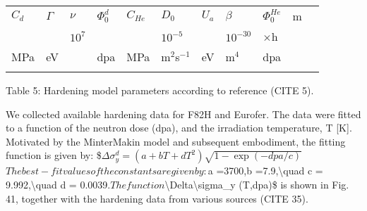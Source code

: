 \documentclass[letterpaper,10pt,english]{jupyterBook}
\begin{document}
	
	\begin{savenotes}\sphinxattablestart
		\sphinxthistablewithglobalstyle
		\centering
		\begin{tabulary}{\linewidth}[t]{TTTTTTTTTTT}
			\sphinxtoprule
			\sphinxstyletheadfamily 
			\sphinxAtStartPar
			\(C_d\)
			&\sphinxstyletheadfamily 
			\sphinxAtStartPar
			\(\Gamma\)
			&\sphinxstyletheadfamily 
			\sphinxAtStartPar
			\(\nu\)
			&\sphinxstyletheadfamily 
			\sphinxAtStartPar
			\(\Phi_0^d\)
			&\sphinxstyletheadfamily 
			\sphinxAtStartPar
			\(C_{He}\)
			&\sphinxstyletheadfamily 
			\sphinxAtStartPar
			\(D_0\)
			&\sphinxstyletheadfamily 
			\sphinxAtStartPar
			\(U_a\)
			&\sphinxstyletheadfamily 
			\sphinxAtStartPar
			\(\beta\)
			&\sphinxstyletheadfamily 
			\sphinxAtStartPar
			\(\Phi_0^{He}\)
			&\sphinxstyletheadfamily 
			\sphinxAtStartPar
			m
			&
			\sphinxAtStartPar
			
			\\
			\sphinxmidrule
			\sphinxtableatstartofbodyhook
			&
			&
			\sphinxAtStartPar
			\(10^7\)
			&
			&
			&
			\sphinxAtStartPar
			\(10^{-5}\)
			&
			&
			\sphinxAtStartPar
			\(10^{-30}\)
			&
			\(\times\)h
			&
			&
			\sphinxAtStartPar
			
			\\
			\sphinxhline
			\sphinxAtStartPar
			MPa
			&
			\sphinxAtStartPar
			eV
			&
			\sphinxAtStartPar
			\sphinxhyphen{}
			&
			\sphinxAtStartPar
			dpa
			&
			\sphinxAtStartPar
			MPa
			&
			\sphinxAtStartPar
			m\(^2\)s\(^{-1}\)
			&
			\sphinxAtStartPar
			eV
			&
			\sphinxAtStartPar
			m\(^4\)
			&
			\sphinxAtStartPar
			dpa
			&
			\sphinxAtStartPar
			\sphinxhyphen{}
			&
			\sphinxAtStartPar
			
			\\
			\sphinxbottomrule
		\end{tabulary}
		\sphinxtableafterendhook\par
		\sphinxattableend\end{savenotes}
	
	\sphinxAtStartPar
	Table 5: Hardening model parameters according to reference (CITE 5).
	
	\sphinxAtStartPar
	We collected available hardening data for F82H and Eurofer. The data were fitted to a function of the neutron dose (dpa), and the irradiation temperature, T {[}K{]}. Motivated by the Minter\sphinxhyphen{}Makin model and subsequent embodiment, the fitting function is given by:
	\$\( \Delta \sigma_y^{d}=(a+bT+dT^2)\sqrt{1-\exp(- dpa/c)} \)\(
	The best-fit values of the constants are given by: \)a =3700,b =\sphinxhyphen{}7.9,\textbackslash{}quad c = 9.992,\textbackslash{}quad d = 0.0039.\( The function \)\textbackslash{}Delta\textbackslash{}sigma\_y (T,dpa)\$ is shown in Fig. 41, together with the hardening data from various sources (CITE 35).
	
\end{document}
